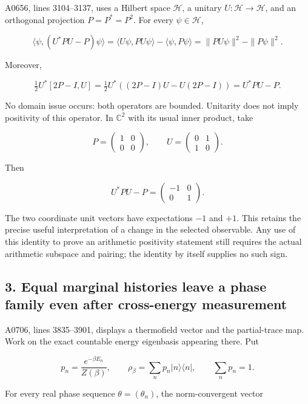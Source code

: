 A0656, lines 3104--3137, uses a Hilbert space \(\mathcal H\), a unitary
\(U:\mathcal H\to\mathcal H\), and an orthogonal projection
\(P=P^*=P^2\). For every \(\psi\in\mathcal H\),

\[
\langle\psi,(U^*PU-P)\psi\rangle
=\langle U\psi,PU\psi\rangle-\langle\psi,P\psi\rangle
=\|PU\psi\|^2-\|P\psi\|^2.
\]

Moreover,

\[
\tfrac12U^*[2P-I,U]
=\tfrac12U^*((2P-I)U-U(2P-I))
=U^*PU-P.
\]

No domain issue occurs: both operators are bounded. Unitarity does not
imply positivity of this operator. In \(\mathbb C^2\) with its usual
inner product, take

\[
P=\begin{pmatrix}1&0\\0&0\end{pmatrix},
\qquad U=\begin{pmatrix}0&1\\1&0\end{pmatrix}.
\]

Then

\[
U^*PU-P=\begin{pmatrix}-1&0\\0&1\end{pmatrix}.
\]

The two coordinate unit vectors have expectations \(-1\) and \(+1\).
This retains the precise useful interpretation of a change in the
selected observable. Any use of this identity to prove an arithmetic
positivity statement still requires the actual arithmetic subspace and
pairing; the identity by itself supplies no such sign.

\subsection{3. Equal marginal histories leave a phase family even after
cross-energy
measurement}\label{TranscriptStage:proof10:equal-marginal-histories-leave-a-phase-family-even-after-cross-energy-measurement}

A0706, lines 3835--3901, displays a thermofield vector and the
partial-trace map. Work on the exact countable energy eigenbasis
appearing there. Put

\[
p_n=\frac{e^{-\beta E_n}}{Z(\beta)},\qquad
\rho_\beta=\sum_n p_n|n\rangle\langle n|,
\qquad \sum_n p_n=1.
\]

For every real phase sequence \(\theta=(\theta_n)\), the norm-convergent
vector

